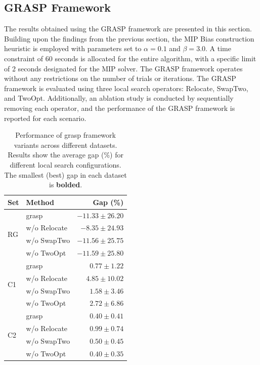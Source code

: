 \documentclass[twocolumn, switch]{article} %
\begin{document}
\subsection{GRASP Framework}

The results obtained using the GRASP framework are presented in this section. Building upon the findings from the previous section, the MIP Bias construction heuristic is employed with parameters set to $\alpha = 0.1$ and $\beta = 3.0$. A time constraint of 60 seconds is allocated for the entire algorithm, with a specific limit of 2 seconds designated for the MIP solver. The GRASP framework operates without any restrictions on the number of trials or iterations.
The GRASP framework is evaluated using three local search operators: Relocate, SwapTwo, and TwoOpt. Additionally, an ablation study is conducted by sequentially removing each operator, and the performance of the GRASP framework is reported for each scenario.


\begin{table}[h]
    \caption{Performance of \gls{grasp} framework variants across different datasets. Results show the average gap (\%) for different local search configurations. The smallest (best) gap in each dataset is \textbf{bolded}.}
    \label{tab:grasp_performance}
    \centering
    \begin{tabular}{llr}
        \toprule
        \textbf{Set} & \textbf{Method} & \textbf{Gap (\%)} \\
        \midrule
        \multirow[c]{4}{*}{RG} 
            & \gls{grasp} & $-11.33 \pm 26.20$ \\
            & w/o Relocate & $-8.35 \pm 24.93$ \\
            & w/o SwapTwo & $-11.56 \pm 25.75$ \\
            & w/o TwoOpt & $\mathbf{-11.59 \pm 25.80}$ \\
        \midrule
        \multirow[c]{4}{*}{C1} 
            & \gls{grasp} & $\mathbf{0.77 \pm 1.22}$ \\
            & w/o Relocate & $4.85 \pm 10.02$ \\
            & w/o SwapTwo & $1.58 \pm 3.46$ \\
            & w/o TwoOpt & $2.72 \pm 6.86$ \\
        \midrule
        \multirow[c]{4}{*}{C2} 
            & \gls{grasp} & $\mathbf{0.40 \pm 0.41}$ \\
            & w/o Relocate & $0.99 \pm 0.74$ \\
            & w/o SwapTwo & $0.50 \pm 0.45$ \\
            & w/o TwoOpt & $\mathbf{0.40 \pm 0.35}$ \\
        \bottomrule
    \end{tabular}
\end{table}
\end{document}
